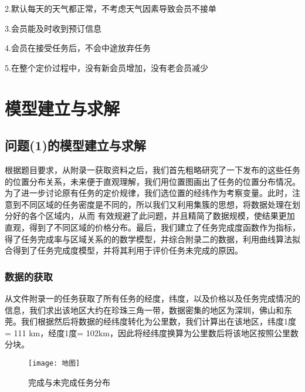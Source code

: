 \documentclass{ctexart}
\begin{document}
2.默认每天的天气都正常，不考虑天气因素导致会员不接单

3.会员能及时收到预订信息

4.会员在接受任务后，不会中途放弃任务

5.在整个定价过程中，没有新会员增加，没有老会员减少



\section{模型建立与求解}
\subsection{问题(1)的模型建立与求解}
根据题目要求，从附录一获取资料之后，我们首先粗略研究了一下发布的这些任务的位置分布关系，未来便于直观理解，我们用位置图画出了任务的位置分布情况。为了进一步讨论原有任务的定价规律，我们选位置的经纬作为考察变量。此时，注意到不同区域的任务密度是不同的，所以我们又利用集簇的思想，将数据处理在划分好的各个区域内，从而 有效规避了此问题，并且精简了数据规模，使结果更加直观，得到了不同区域的价格分布。最后，我们建立了任务完成度函数作为指标，得了任务完成率与区域关系的的数学模型，并综合附录二的数据，利用曲线算法拟合得到了任务完成度模型，并将其利用于评价任务未完成的原因。
\subsubsection{数据的获取}
从文件附录一的任务获取了所有任务的经度，纬度，以及价格以及任务完成情况的信息，我们求出该地区大约在珍珠三角一带，数据密集的地区为深圳，佛山和东莞。我们根据然后将数据的经纬度转化为公里数，我们计算出在该地区，纬度1度= 111 km，经度1度= 102km，因此将经纬度换算为公里数后将该地区按照公里数分块。
\begin{figure}[htbp] 
\centering
\texttt{[image: 地图]} 
\caption{完成与未完成任务分布}
\end{figure}
\newpage
\end{document}
